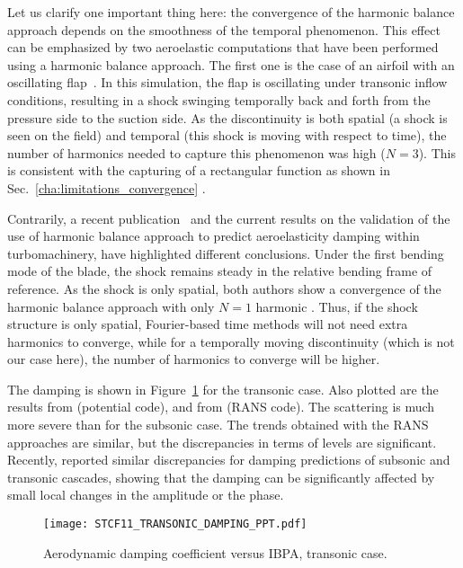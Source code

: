 Let us clarify one important thing here: 
the convergence of the harmonic balance approach depends
on the smoothness of the temporal phenomenon.
This effect can be emphasized by two 
aeroelastic computations that have been performed 
using a harmonic balance approach. 
The first one is the case of 
an airfoil with an oscillating 
flap~\cite{JDufour2009}. In this simulation, the flap is oscillating
under transonic inflow conditions, resulting in a shock swinging temporally
back and forth from the pressure side to the
suction side. As the discontinuity is
both spatial (a shock is seen on the field) and temporal
(this shock is moving with respect to time), the number
of harmonics needed to capture this phenomenon was high ($N=3$). This is
consistent with the capturing of a rectangular function
as shown in Sec.~\ref{cha:limitations_convergence}
.

Contrarily, a recent publication~\cite{Huang2013a} and the
current results on the validation
of the use of harmonic balance approach to predict
aeroelasticity damping within turbomachinery, have highlighted
different conclusions. Under the first bending mode
of the blade, the shock remains  
steady in the relative bending frame
of reference. As the shock
is only spatial, both authors show a convergence of the
harmonic balance approach with only $N=1$ harmonic
. Thus, if the shock
structure is only spatial, Fourier-based time methods will not need
extra harmonics to converge, while for a temporally moving discontinuity
(which is not our case here), the number
of harmonics to converge will be higher. 

The damping is shown in Figure~\ref{fig:stcf11_transonic_damping} for
the transonic case. Also plotted are the results from
\citet{Fransson1999} (potential code), and 
from \citet{Cinnella2004} (RANS code). The scattering is much more severe
than for the subsonic case. The trends obtained with the RANS 
approaches are similar, but the discrepancies in terms of
levels are significant.
Recently, \citet{Vogt2011} reported similar discrepancies 
for damping predictions of subsonic and transonic cascades, 
showing that the damping can be significantly affected by 
small local changes in the amplitude or the phase.
\begin{figure}[htp]
  \centering
  \texttt{[image: STCF11\_TRANSONIC\_DAMPING\_PPT.pdf]}
  \caption{Aerodynamic damping coefficient versus IBPA, transonic case.}
  \label{fig:stcf11_transonic_damping}
\end{figure}

